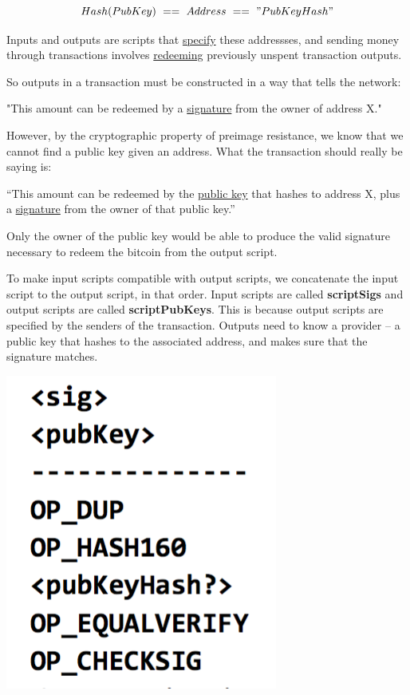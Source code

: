 \documentclass[full.tex]{subfiles}
\begin{document}
   $$Hash(PubKey)~==~Address~==~"PubKeyHash"$$
   
   Inputs and outputs are scripts that \underline{specify} these addressses, and sending money through transactions involves \underline{redeeming} previously unspent transaction outputs.
   
   So outputs in a transaction must be constructed in a way that tells the network:
   
   "This amount can be redeemed by a \underline{signature} from the owner of address X." 
   
   However, by the cryptographic property of preimage resistance, we know that we cannot find a public key given an address. What the transaction should really be saying is:
   
   ``This amount can be redeemed by the \underline{public key} that hashes to address X, plus a \underline{signature} from the owner of that public key.''
   
   Only the owner of the public key would be able to produce the valid signature necessary to redeem the bitcoin from the output script.
   
   To make input scripts compatible with output scripts, we concatenate the input script to the output script, in that order. Input scripts are called \textbf{scriptSigs} and output scripts are called \textbf{scriptPubKeys}. This is because output scripts are specified by the senders of the transaction. Outputs need to know a provider -- a public key that hashes to the associated address, and makes sure that the signature matches.
   
  \includegraphics[scale=1]{output_script}
  
\end{document}
